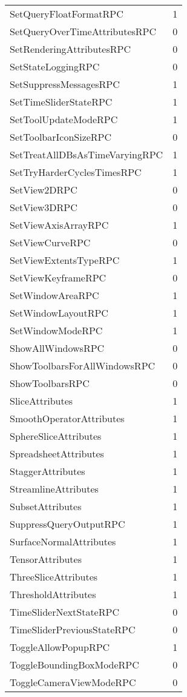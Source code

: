 \documentclass[10pt,a4paper]{report}
\begin{document}
\begin{longtable}{ll}
SetQueryFloatFormatRPC & 1 \\
SetQueryOverTimeAttributesRPC & 0 \\
SetRenderingAttributesRPC & 0 \\
SetStateLoggingRPC & 0 \\
SetSuppressMessagesRPC & 1 \\
SetTimeSliderStateRPC & 1 \\
SetToolUpdateModeRPC & 1 \\
SetToolbarIconSizeRPC & 0 \\
SetTreatAllDBsAsTimeVaryingRPC & 1 \\
SetTryHarderCyclesTimesRPC & 1 \\
SetView2DRPC & 0 \\
SetView3DRPC & 0 \\
SetViewAxisArrayRPC & 1 \\
SetViewCurveRPC & 0 \\
SetViewExtentsTypeRPC & 1 \\
SetViewKeyframeRPC & 0 \\
SetWindowAreaRPC & 1 \\
SetWindowLayoutRPC & 1 \\
SetWindowModeRPC & 1 \\
ShowAllWindowsRPC & 0 \\
ShowToolbarsForAllWindowsRPC & 0 \\
ShowToolbarsRPC & 0 \\
SliceAttributes & 1 \\
SmoothOperatorAttributes & 1 \\
SphereSliceAttributes & 1 \\
SpreadsheetAttributes & 1 \\
StaggerAttributes & 1 \\
StreamlineAttributes & 1 \\
SubsetAttributes & 1 \\
SuppressQueryOutputRPC & 1 \\
SurfaceNormalAttributes & 1 \\
TensorAttributes & 1 \\
ThreeSliceAttributes & 1 \\
ThresholdAttributes & 1 \\
TimeSliderNextStateRPC & 0 \\
TimeSliderPreviousStateRPC & 0 \\
ToggleAllowPopupRPC & 1 \\
ToggleBoundingBoxModeRPC & 0 \\
ToggleCameraViewModeRPC & 0 \\

\end{longtable}
\end{document}
